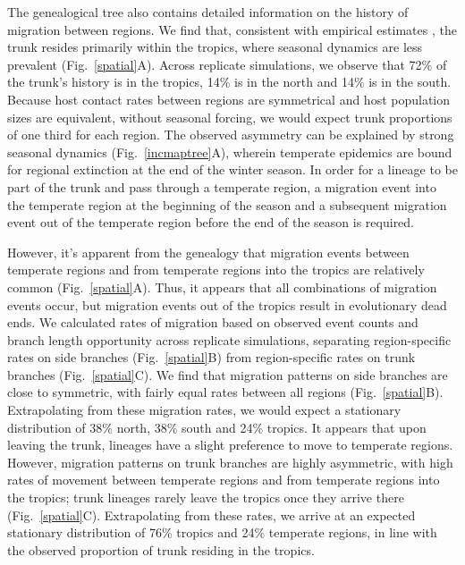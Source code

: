 \documentclass[11pt,oneside,letterpaper]{article}
\begin{document}
The genealogical tree also contains detailed information on the history of migration between regions.  We find that, consistent with empirical estimates \cite{Russell08,Bedford10}, the trunk resides primarily within the tropics, where seasonal dynamics are less prevalent (Fig.~\ref{spatial}A).  Across replicate simulations, we observe that 72\% of the trunk's history is in the tropics, 14\% is in the north and 14\% is in the south.  Because host contact rates between regions are symmetrical and host population sizes are equivalent, without seasonal forcing, we would expect trunk proportions of one third for each region.  The observed asymmetry can be explained by strong seasonal dynamics (Fig.~\ref{incmaptree}A), wherein temperate epidemics are bound for regional extinction at the end of the winter season.  In order for a lineage to be part of the trunk and pass through a temperate region, a migration event into the temperate region at the beginning of the season and a subsequent migration event out of the temperate region before the end of the season is required. 

However, it's apparent from the genealogy that migration events between temperate regions and from temperate regions into the tropics are relatively common (Fig.~\ref{spatial}A).  Thus, it appears that all combinations of migration events occur, but migration events out of the tropics result in evolutionary dead ends.  We calculated rates of migration based on observed event counts and branch length opportunity across replicate simulations, separating region-specific rates on side branches (Fig.~\ref{spatial}B) from region-specific rates on trunk branches (Fig.~\ref{spatial}C).  We find that migration patterns on side branches are close to symmetric, with fairly equal rates between all regions (Fig.~\ref{spatial}B).  Extrapolating from these migration rates, we would expect a stationary distribution of 38\% north, 38\% south and 24\% tropics.  It appears that upon leaving the trunk, lineages have a slight preference to move to temperate regions.  However, migration patterns on trunk branches are highly asymmetric, with high rates of movement between temperate regions and from temperate regions into the tropics; trunk lineages rarely leave the tropics once they arrive there (Fig.~\ref{spatial}C).  Extrapolating from these rates, we arrive at an expected stationary distribution of 76\% tropics and 24\% temperate regions, in line with the observed proportion of trunk residing in the tropics.
\end{document}
